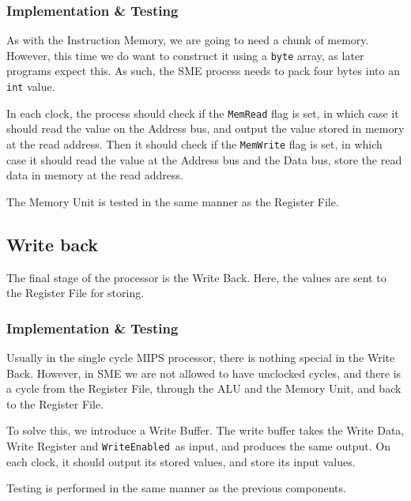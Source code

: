 \subsubsection*{Implementation \& Testing}
As with the Instruction Memory, we are going to need a chunk of memory.
However, this time we do want to construct it using a \texttt{byte} array, as
later programs expect this. As such, the SME process needs to pack four bytes
into an \texttt{int} value.

In each clock, the process should check if the \texttt{MemRead} flag is set, in
which case it should read the value on the Address bus, and output the value
stored in memory at the read address. Then it should check if the
\texttt{MemWrite} flag is set, in which case it should read the value at the
Address bus and the Data bus, store the read data in memory at the read
address.

The Memory Unit is tested in the same manner as the Register File.

\subsection{Write back}
The final stage of the processor is the Write Back. Here, the values are sent
to the Register File for storing.

\subsubsection*{Implementation \& Testing}
Usually in the single cycle MIPS processor, there is nothing special in the
Write Back. However, in SME we are not allowed to have unclocked cycles, and
there is a cycle from the Register File, through the ALU and the Memory Unit,
and back to the Register File.

To solve this, we introduce a Write Buffer. The write buffer takes the Write
Data, Write Register and \texttt{WriteEnabled} as input, and produces the same
output. On each clock, it should output its stored values, and store its input
values.

Testing is performed in the same manner as the previous components.

